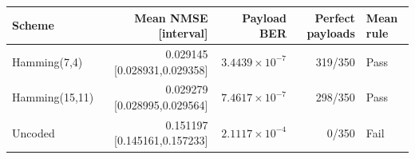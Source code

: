 \begin{tabular}{lrrrl}
\toprule
Scheme & Mean NMSE [interval] & Payload BER & Perfect payloads & Mean rule \\
\midrule
Hamming(7,4) & 0.029145 [0.028931,0.029358] & $3.4439\times10^{-7}$ & 319/350 & Pass \\
Hamming(15,11) & 0.029279 [0.028995,0.029564] & $7.4617\times10^{-7}$ & 298/350 & Pass \\
Uncoded & 0.151197 [0.145161,0.157233] & $2.1117\times10^{-4}$ & 0/350 & Fail \\
\bottomrule
\end{tabular}
